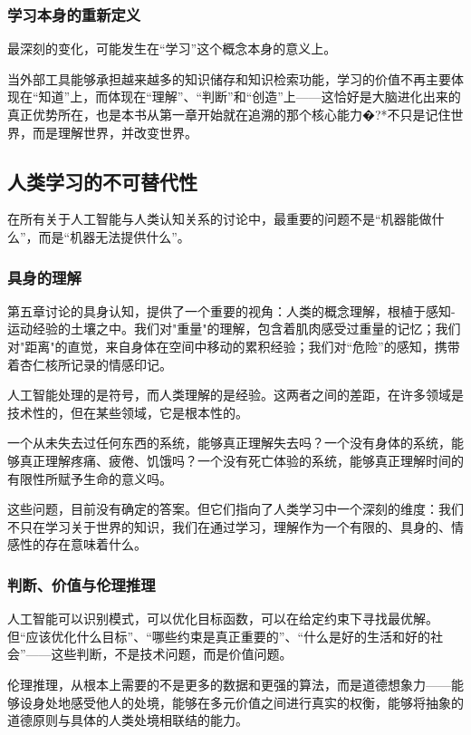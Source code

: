 \documentclass[11pt]{article}
\begin{document}
\subsubsection{学习本身的重新定义}
\label{sec:org1205b7c}

最深刻的变化，可能发生在“学习”这个概念本身的意义上。

当外部工具能够承担越来越多的知识储存和知识检索功能，学习的价值不再主要体现在“知道”上，而体现在“理解”、“判断”和“创造”上——这恰好是大脑进化出来的真正优势所在，也是本书从第一章开始就在追溯的那个核心能力�?*不只是记住世界，而是理解世界，并改变世界。
\subsection{人类学习的不可替代性}
\label{sec:org5744dce}

在所有关于人工智能与人类认知关系的讨论中，最重要的问题不是“机器能做什么”，而是“机器无法提供什么”。
\subsubsection{具身的理解}
\label{sec:org1ae0998}

第五章讨论的具身认知，提供了一个重要的视角：人类的概念理解，根植于感知-运动经验的土壤之中。我们对"重量"的理解，包含着肌肉感受过重量的记忆；我们对"距离"的直觉，来自身体在空间中移动的累积经验；我们对“危险”的感知，携带着杏仁核所记录的情感印记。

人工智能处理的是符号，而人类理解的是经验。这两者之间的差距，在许多领域是技术性的，但在某些领域，它是根本性的。

一个从未失去过任何东西的系统，能够真正理解失去吗？一个没有身体的系统，能够真正理解疼痛、疲倦、饥饿吗？一个没有死亡体验的系统，能够真正理解时间的有限性所赋予生命的意义吗。

这些问题，目前没有确定的答案。但它们指向了人类学习中一个深刻的维度：我们不只在学习关于世界的知识，我们在通过学习，理解作为一个有限的、具身的、情感性的存在意味着什么。
\subsubsection{判断、价值与伦理推理}
\label{sec:orgd32ea17}

人工智能可以识别模式，可以优化目标函数，可以在给定约束下寻找最优解。但“应该优化什么目标”、“哪些约束是真正重要的”、“什么是好的生活和好的社会”——这些判断，不是技术问题，而是价值问题。

伦理推理，从根本上需要的不是更多的数据和更强的算法，而是道德想象力——能够设身处地感受他人的处境，能够在多元价值之间进行真实的权衡，能够将抽象的道德原则与具体的人类处境相联结的能力。
\end{document}
